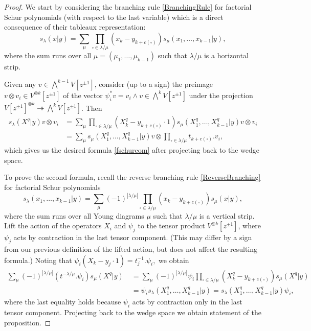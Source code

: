 \documentclass[12pt]{amsart}
\numberwithin{equation}{section}
\numberwithin{figure}{section}
\begin{document}
    \begin{proof}
        We start by considering the branching rule \eqref{BranchingRule} for factorial Schur polynomials (with respect to the last variable) which is a direct consequence of their tableaux representation:
        \[
        s_\lambda(x|y) = \sum_{\mu} \prod\limits_{\square \in \lambda / \mu} (x_k - y_{k + c(\square)}) s_{\mu}(x_1, \ldots, x_{k - 1}|y),
        \]
        where the sum runs over all $\mu=(\mu_1,\ldots,\mu_{k-1})$ such that $\lambda/\mu$ is a horizontal strip. 

        Given any $v\in\bigwedge^{k-1}V[z^{\pm1}]$, consider (up to a sign) the preimage $v \otimes v_i \in V^{\otimes k}[z^{\pm1}]$ of the vector $\psi^*_i v = v_i \wedge v \in \bigwedge^{k}V[z^{\pm1}]$ under the projection $V[z^{\pm1}]^{\otimes k}\twoheadrightarrow\bigwedge^kV[z^{\pm1}]$. Then
        \begin{align*}
        s_{\lambda}(X^q|y) v \otimes v_i &= \sum_{\mu} \prod\limits_{\square \in \lambda / \mu} (X^q_k - y_{k + c(\square)}\cdot 1) s_{\mu}(X^q_1, \ldots, X^q_{k - 1}|y) v \otimes v_i \\
        &= \sum_\mu s_{\mu}(X^q_1, \ldots, X^q_{k - 1}|y)v \otimes \prod\limits_{\square \in \lambda / \mu} t_{k + c(\square)}.v_i,
        \end{align*}
        which gives us the desired formula \eqref{fschurcom} after projecting back to the wedge space.
        
        To prove the second formula, recall the reverse branching rule \eqref{ReverseBranching} for factorial Schur polynomials
        \[
        s_{\lambda}(x_1, \ldots, x_{k - 1}|y) = \sum\limits_{\mu}(-1)^{|\lambda/\mu|}\prod\limits_{\square \in \lambda / \mu}(x_k - y_{k + c(\square)}) s_{\mu}(x|y),
        \]
        where the sum runs over all Young diagrams $\mu$ such that $\lambda / \mu$ is a vertical strip. Lift the action of the operators $X_i$ and $\psi_j$ to the tensor product $V^{\otimes k}[z^{\pm 1}]$, where $\psi_j$ acts by contraction in the last tensor component. (This may differ by a sign from our previous definition of the lifted action, but does not affect the resulting formula.) Noting that $
        \psi_i (X_k - y_j\cdot 1) = t^{-1}_j.\psi_i, 
        $ 
        we obtain
        \begin{align*}
        \sum\limits_{\mu}(-1)^{|\lambda / \mu|} (t^{- \lambda / \mu}.\psi_i)s_{\mu}(X^q|y) \;&= \sum\limits_{\mu} (-1)^{|\lambda / \mu|}\psi_i \prod\limits_{\square \in \lambda / \mu}(X_k^q - y_{k + c(\square)})s_\mu(X^q | y) \\
        \;&= \psi_i s_{\lambda}(X_1^q, \ldots, X_{k - 1}^q|y) = s_{\lambda}(X_1^q, \ldots, X_{k - 1}^q|y) \psi_i,  
        \end{align*}
        where the last equality holds because $\psi_i$ acts by contraction only in the last tensor component. Projecting back to the wedge space we obtain statement of the proposition.
    \end{proof}
\end{document}

